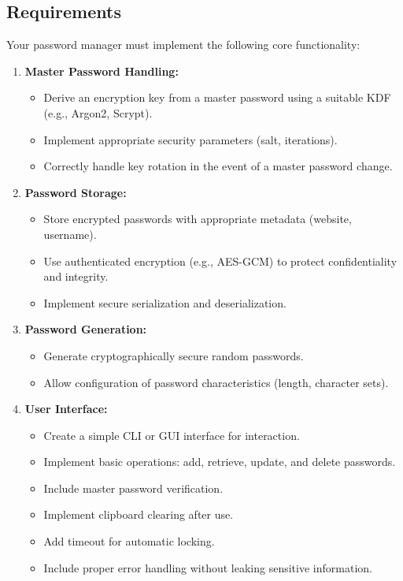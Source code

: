 \documentclass[10pt,a4paper,american]{article}
\begin{document}
\subsection*{Requirements}
Your password manager must implement the following core functionality:

\begin{enumerate}
	\item \textbf{Master Password Handling:}
	      \begin{itemize}
		      \item Derive an encryption key from a master password using a suitable KDF (e.g., Argon2, Scrypt).
		      \item Implement appropriate security parameters (salt, iterations).
		      \item Correctly handle key rotation in the event of a master password change.
	      \end{itemize}

	\item \textbf{Password Storage:}
	      \begin{itemize}
		      \item Store encrypted passwords with appropriate metadata (website, username).
		      \item Use authenticated encryption (e.g., AES-GCM) to protect confidentiality and integrity.
		      \item Implement secure serialization and deserialization.
	      \end{itemize}

	\item \textbf{Password Generation:}
	      \begin{itemize}
		      \item Generate cryptographically secure random passwords.
		      \item Allow configuration of password characteristics (length, character sets).
	      \end{itemize}

	\item \textbf{User Interface:}
	      \begin{itemize}
		      \item Create a simple CLI or GUI interface for interaction.
		      \item Implement basic operations: add, retrieve, update, and delete passwords.
		      \item Include master password verification.
		      \item Implement clipboard clearing after use.
		      \item Add timeout for automatic locking.
		      \item Include proper error handling without leaking sensitive information.
	      \end{itemize}
\end{enumerate}
\end{document}
